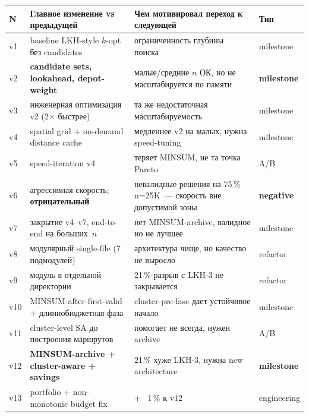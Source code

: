 \documentclass[a4paper,14pt]{extreport}
\begin{document}
\begin{center}\footnotesize
\begin{tabular}{|C{0.5cm}|L{4.7cm}|L{6.6cm}|C{1.6cm}|}
\hline
\textbf{N} & \textbf{Главное изменение vs предыдущей} & \textbf{Чем мотивировал переход к следующей} & \textbf{Тип} \\
\hline
v1  & baseline LKH-style $k$-opt без candidates       & ограниченность глубины поиска                                        & milestone \\
\hline
v2  & \textbf{candidate sets, lookahead, depot-weight} & малые/средние $n$ ОК, но не масштабируется по памяти              & \textbf{milestone} \\
\hline
v3  & инженерная оптимизация v2 (2$\times$ быстрее)    & та же недостаточная масштабируемость                              & milestone \\
\hline
v4  & spatial grid + on-demand distance cache          & медленнее v2 на малых, нужна speed-tuning                            & milestone \\
\hline
v5  & speed-iteration v4                                & теряет MINSUM, не та точка Pareto                                 & A/B \\
\hline
v6  & агрессивная скорость; \textbf{отрицательный}     & невалидные решения на 75\,\% n=25K~--- скорость вне допустимой зоны & \textbf{negative} \\
\hline
v7  & закрытие v4--v7, end-to-end на больших~$n$        & нет MINSUM-archive, валидное но не лучшее                          & milestone \\
\hline
v8  & модулярный single-file (7 подмодулей)             & архитектура чище, но качество не выросло                            & refactor \\
\hline
v9  & модуль в отдельной директории                     & 21\,\%-разрыв с LKH-3 не закрывается                                & refactor \\
\hline
v10 & MINSUM-after-first-valid + длиннобюджетная фаза   & cluster-pre-fase дает устойчивое начало                            & milestone \\
\hline
v11 & cluster-level SA до построения маршрутов          & помогает не всегда, нужен archive                                  & A/B \\
\hline
v12 & \textbf{MINSUM-archive + cluster-aware + savings} & 21\,\% хуже LKH-3, нужна new architecture                          & \textbf{milestone} \\
\hline
v13 & portfolio + non-monotonic budget fix              & + ~1\,\% к v12                                                     & engineering \\

\end{tabular}
\end{center}
\end{document}
